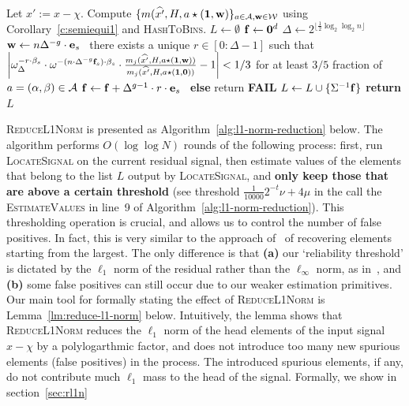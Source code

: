 \begin{algorithm}[H]
\caption{Location primitive: given a set of measurements corresponding to a single hash function, returns a list of elements in $\nsq$, one per each hash bucket}\label{alg:location}
\begin{algorithmic}[1]
\State Let $x':=x-\chi$. Compute $\{m(\widehat{x'}, H, a\star (\mathbf{1}, \mathbf{w})\}_{a\in {\mathcal{A}}, \mathbf{w}\in \mathcal{W}}$ using Corollary~\ref{c:semiequi1} and \textsc{HashToBins}.
\State $L\gets \emptyset$
\State ${\bf f}\gets {\bf 0}^d$
\State $\Delta\gets 2^{\lfloor \frac1{2}\log_2 \log_2 n\rfloor}$
\State $\mathbf{w}\gets n\Delta^{-g} \cdot \mathbf{e}_s$ 
~there exists a unique $r\in [0:\Delta-1]$ such that  
\State~~~~~$\left|\omega_{\Delta}^{-r\cdot \beta_s}\cdot \omega^{-(n\cdot \Delta^{-g} {\bf f}_s)\cdot \beta_s}\cdot \frac{m_j(\widehat{x'}, H, a\star (\mathbf{1}, \mathbf{w}))}{m_j(\widehat{x'}, H, a\star (\mathbf{1}, \mathbf{0}))}-1\right|<1/3$ for at least $3/5$ fraction of $a=(\alpha, \beta)\in {\mathcal{A}}$
  ${\bf f}\gets {\bf f}+\Delta^{g-1}\cdot r\cdot {\bf e}_s$ ~{\bf else} return {\bf FAIL}
\EndFor
\EndFor
\State $L \gets L \cup \{\Sigma^{-1}{\bf f}\}$ 
\EndFor
\State \textbf{return} $L$
\EndProcedure 
\end{algorithmic}
\end{algorithm}


\textsc{ReduceL1Norm} is presented as Algorithm~\ref{alg:l1-norm-reduction} below. The algorithm performs $O(\log\log N)$ rounds of the following process: first, run \textsc{LocateSignal} on the current residual signal, then estimate values of the elements that belong to the list $L$ output by \textsc{LocateSignal}, and {\bf only keep those that are above a certain threshold} (see threshold $\frac1{10000} 2^{-t} \nu+4\mu$ in the call the \textsc{EstimateValues} in line~9 of Algorithm~\ref{alg:l1-norm-reduction}). This thresholding operation is crucial, and allows us to control the number of false positives. In fact, this is very similar to the approach of~\cite{IK14a} of recovering elements starting from the largest. The only difference is that {\bf (a)} our `reliability threshold' is dictated by the $\ell_1$ norm of the residual rather than the $\ell_\infty$ norm, as in~\cite{IK14a}, and {\bf (b)} some false positives can still occur due to our weaker estimation primitives. Our main tool for formally stating the effect of \textsc{ReduceL1Norm} is Lemma~\ref{lm:reduce-l1-norm}  below. Intuitively, the lemma shows that \textsc{ReduceL1Norm} reduces the $\ell_1$ norm of the head elements of the input signal $x-\chi$ by a polylogarthmic factor, and does not introduce too many new spurious elements (false positives) in the process. The  introduced spurious elements, if any, do not contribute much $\ell_1$ mass to the head of the signal. Formally, we show in section~\ref{sec:rl1n}

